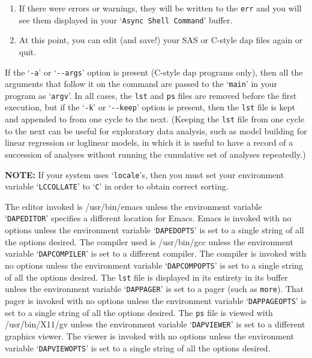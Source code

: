 \documentclass{book}
\renewcommand{\_}{\Texinfounderscore\discretionary{}{}{}}
\begin{document}
\begin{enumerate}[start=1]
\item If there were errors or warnings, they will be written
to the \texttt{err} and you will see them displayed in your
`\texttt{Async Shell Command}' buffer.

\item At this point, you can edit (and save!) your SAS or C-style dap files again or quit.
\end{enumerate}

If the `\texttt{-a}' or `\texttt{{-}{-}args}'
%
%
option is present (C-style dap programs only),
then all the arguments that follow it on the command
are passed to the `\texttt{main}' in your program as `\texttt{argv}'.
In all cases, the \texttt{lst} and \texttt{ps} files
%
%
are removed before the
first execution, but if the `\texttt{-k}' or `\texttt{{-}{-}keep}' option is present, then the \texttt{lst}
file is kept
%
and appended to from one cycle to the next.  
(Keeping the \texttt{lst} file from one cycle to the next can be useful for
exploratory data analysis,
%
%
such as model building for linear regression
or loglinear models, in which it is useful to have a record of a
succession of analyses without running the cumulative set of analyses
repeatedly.)

\textbf{NOTE:} If your system uses `\texttt{locale}'s, then you must set
your environment variable `\texttt{LC\_COLLATE}' to `\texttt{C}' in order to
obtain correct sorting.

The editor
%
invoked is /usr/bin/emacs unless the environment variable `\texttt{DAPEDITOR}'
specifies a different location for Emacs.
Emacs is invoked with no options unless the environment variable
`\texttt{DAPEDOPTS}' is set to a single string of all the options desired.  
The compiler
%
used is /usr/bin/gcc unless the environment variable `\texttt{DAPCOMPILER}'
is set to a different compiler.
The compiler is invoked with no options unless the environment variable
`\texttt{DAPCOMPOPTS}' is set to a single string of all the options desired.  
The \texttt{lst} file is displayed in its entirety in its buffer
unless the environment variable `\texttt{DAPPAGER}' is set to a pager
(such as \texttt{more}).
That pager is invoked with no options unless the environment variable
`\texttt{DAPPAGEOPTS}' is set to a single string of all the options desired.  
The \texttt{ps} file is viewed
%
with /usr/bin/X11/gv unless the environment variable `\texttt{DAPVIEWER}'
is set to a different graphics viewer.
The viewer is invoked with no options unless the environment variable
`\texttt{DAPVIEWOPTS}' is set to a single string of all the options desired.  
\end{document}
